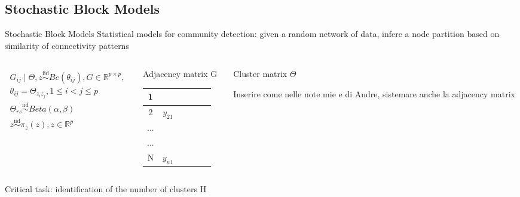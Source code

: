  





\subsection{Stochastic Block Models}

\begin{frame}{Stochastic Block Models}
    Statistical models for \alert{community detection}: given a random network of data, infere a node partition based on similarity of connectivity patterns\\

    \begin{columns}
        \begin{column}{0.30\textwidth}
            \begin{align*}
                G_{ij} \mid \Theta,z \overset{\mathrm{iid}}{\sim} Be(\theta_{ij}),  G \in \mathbb{R}^{p×p}, \\
                \theta_{ij} = \Theta_{z_{i}z_{j}}, 1 \le i < j \le p \\ 
                \Theta_{rs} \overset{\mathrm{iid}}{\sim} Beta(\alpha, \beta)\\
                z \overset{\mathrm{iid}}{\sim} \pi_{z}(z), z \in \mathbb{R}^p
            \end{align*}
            \end{column}
        \begin{column}{0.30\textwidth}
            \alert{Adjacency matrix G}
            \begin{table}[htpb]
            \centering
            \begin{tabular}{c|c|c|c|c|c|} 
            \hline
            1   & &    &    &   &     \\ 
            \hline
            2  &  $y_{21}$ &    &    &   &     \\ 
            \hline
            ...  &   &    &    &   &     \\ 
            \hline
            ...  &   &    &    &   &     \\ 
            \hline
            N  & $y_{n1}$   &    &    &   &  
            \end{tabular}
            \end{table}
        \end{column}


        \begin{column}{0.25\textwidth}
        \alert{Cluster matrix $\Theta$}

        Inserire come nelle note mie e di Andre, sistemare anche la adjacency matrix
        \end{column}

    \end{columns}



    \begin{center}
    Critical task: \alert{identification of the number of clusters H}
    \end{center}


\end{frame}
